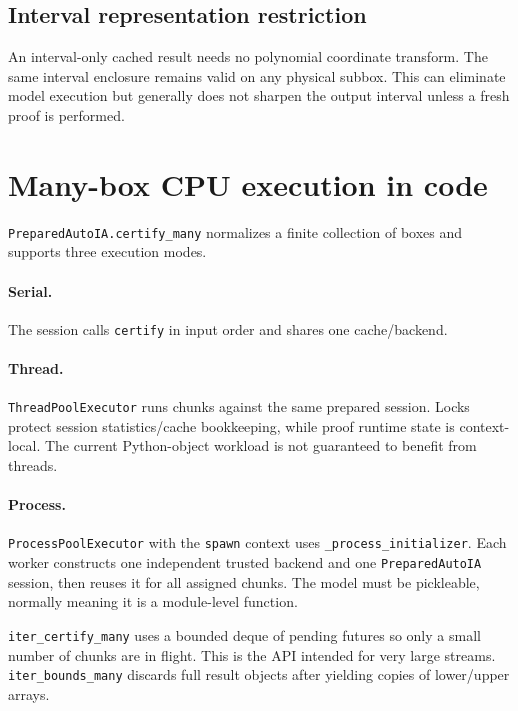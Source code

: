 \documentclass[11pt]{article}
\begin{document}
\subsection{Interval representation restriction}

An interval-only cached result needs no polynomial coordinate transform.  The
same interval enclosure remains valid on any physical subbox.  This can eliminate
model execution but generally does not sharpen the output interval unless a fresh
proof is performed.

\section{Many-box CPU execution in code}

\texttt{PreparedAutoIA.certify\_many} normalizes a finite collection of boxes and
supports three execution modes.

\paragraph{Serial.}
The session calls \texttt{certify} in input order and shares one cache/backend.

\paragraph{Thread.}
\texttt{ThreadPoolExecutor} runs chunks against the same prepared session.  Locks
protect session statistics/cache bookkeeping, while proof runtime state is
context-local.  The current Python-object workload is not guaranteed to benefit
from threads.

\paragraph{Process.}
\texttt{ProcessPoolExecutor} with the \texttt{spawn} context uses
\texttt{\_process\_initializer}.  Each worker constructs one independent trusted
backend and one \texttt{PreparedAutoIA} session, then reuses it for all assigned
chunks.  The model must be pickleable, normally meaning it is a module-level
function.

\texttt{iter\_certify\_many} uses a bounded deque of pending futures so only a
small number of chunks are in flight.  This is the API intended for very large
streams.  \texttt{iter\_bounds\_many} discards full result objects after yielding
copies of lower/upper arrays.
\end{document}
